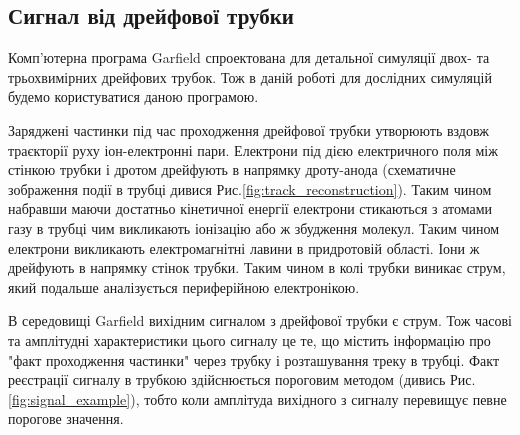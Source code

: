 \documentclass[pdftex,14pt]{scrartcl}
\begin{document}
\begin{spacing}{1.5}

		
	
	
	\section{Сигнал від дрейфової трубки}
	
	Комп'ютерна програма Garfield \cite{garfield} спроектована для детальної симуляції двох- та трьохвимірних дрейфових трубок. Тож в даній роботі для дослідних симуляцій будемо користуватися даною програмою.
	
	Заряджені частинки під час проходження дрейфової трубки утворюють вздовж траєкторії руху іон-електронні пари. Електрони під дією електричного поля між стінкою трубки і дротом дрейфують в напрямку дроту-анода (схематичне зображення події в трубці дивися Рис.\ref{fig:track_reconstruction}). Таким чином набравши маючи достатньо кінетичної енергії електрони стикаються з атомами газу в трубці чим викликають іонізацію або ж збудження молекул. Таким чином електрони викликають електромагнітні лавини в придротовій області. Іони ж дрейфують в напрямку стінок трубки. Таким чином в колі трубки виникає струм, який подальше аналізується периферійною електронікою. 

	В середовищі Garfield вихідним сигналом з дрейфової трубки є струм. Тож часові та амплітудні характеристики цього сигналу це те, що містить інформацію про "факт проходження частинки" через трубку і розташування треку в трубці. Факт реєстрації сигналу в трубкою здійснюється пороговим методом (дивись Рис.\ref{fig:signal_example}), тобто коли амплітуда вихідного з сигналу перевищує певне порогове значення.
	
	
	
	

\end{spacing}
\end{document}
